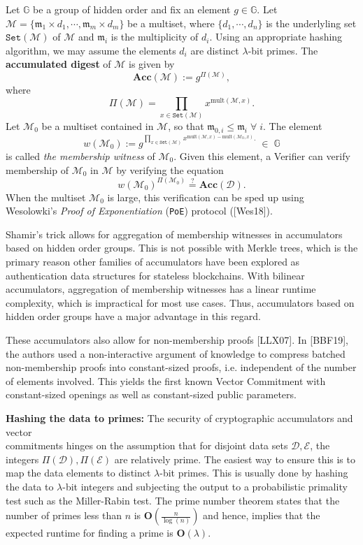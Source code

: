 \documentclass[11pt, lettersize, notitlepage, leqno, footskip=0.6cm]{article}
\newcommand{\pl}{\prod\limits}
\newcommand{\ttt}{\texttt}
\newcommand{\Acc}{\mbf{Acc}}
\newcommand{\sett}{\ttt{Set}}
\newcommand{\mult}{\mr{mult}}
\newcommand{\mc}{\mathcal}
\newcommand{\mb}{\mathbb}
\newcommand{\mbf}{\mathbf}
\newcommand{\mr}{\mathrm}
\newcommand{\mfm}{\mathfrak{m}}
\newcommand{\lam}{\lambda}
\newcommand{\vs}{\vspace{-0.15cm}}
\newcommand{\noin}{\noindent}
\newcommand{\sta}{\stackrel{?}{=}}
\numberwithin{equation}{section}
\begin{document}
Let $\mb{G}$ be a group of hidden order and fix an element $g \in\mb{G}$. Let $\mc{M}= \{\mfm_1\times d_1,\cdots, \mfm_m\times d_m\}$ be a multiset, where $\{d_1,\cdots, d_n \}$ is the underlyling set $\sett(\mc{M})$ of $\mc{M}$ and $\mfm_i$ is the multiplicity of $d_i$. Using an appropriate hashing algorithm, we may assume the elements $d_i$ are distinct $\lam$-bit primes. The \textbf{accumulated digest} of $\mc{M}$ is given by \vs $$\Acc(\mc{M}):= g^{\Pi(\mc{M})} ,$$ where $$\Pi(\mc{M}) = \pl_{x\in \sett(\mc{M})} x^{\mult(\mc{M},x)} .$$ Let $\mc{M}_0$ be a multiset contained in $\mc{M}$, so that  $\mfm_{0,i}\leq \mfm_i\;\forall\;i$. The element \vs $$w(\mc{M}_0):= g^{\pl_{x\in \sett(\mc{M})} x^{\mult(\mc{M},x)-\mult(\mc{M}_0,x)} .}\;\in\;\mb{G} $$ is called \textit{the membership witness} of $\mc{M}_0$. Given this element, a Verifier can verify membership of $\mc{M}_0$ in $\mc{M}$ by verifying the equation \vs $$w(\mc{M}_0)^{\Pi(\mc{M}_0)} \sta \Acc(\mc{D}).$$ When the multiset $\mc{M}_0$ is large, this verification can be sped up using Wesolowki's \textit{Proof of Exponentiation} (\verb|PoE|) protocol ([Wes18]).

Shamir's trick allows for aggregation of membership witnesses in accumulators based on hidden order groups. This is not possible with Merkle trees, which is the primary reason other families of accumulators have been explored as authentication data structures for stateless blockchains. With bilinear accumulators, aggregation of membership witnesses has a linear runtime complexity, which is impractical for most use cases. Thus, accumulators based on hidden order groups have a major advantage in this regard.

These accumulators also allow for non-membership proofs [LLX07]. In [BBF19], the authors used a non-interactive argument of knowledge to compress batched non-membership proofs into constant-sized proofs, i.e. independent of the number of elements involved. This yields the first known Vector Commitment with constant-sized openings as well as  constant-sized public parameters.\vspace{0.1cm}

\noin \textbf{Hashing the data to primes:} The security of cryptographic accumulators and vector\\ commitments hinges on the assumption that for disjoint data sets $\mc{D},\mc{E}$, the integers $\Pi(\mc{D}), \Pi(\mc{E})$ are relatively prime. The easiest way to ensure this is to map the data elements to distinct $\lam$-bit primes. This is usually done by hashing the data to $\lam$-bit integers and subjecting the output to a probabilistic primality test such as the Miller-Rabin test. The prime number theorem states that the number of primes less than $n$ is $\mbf{O}(\frac{n}{\log(n)})$ and hence, implies that the expected runtime for finding a prime is $\mbf{O}(\lam)$.
\end{document}
